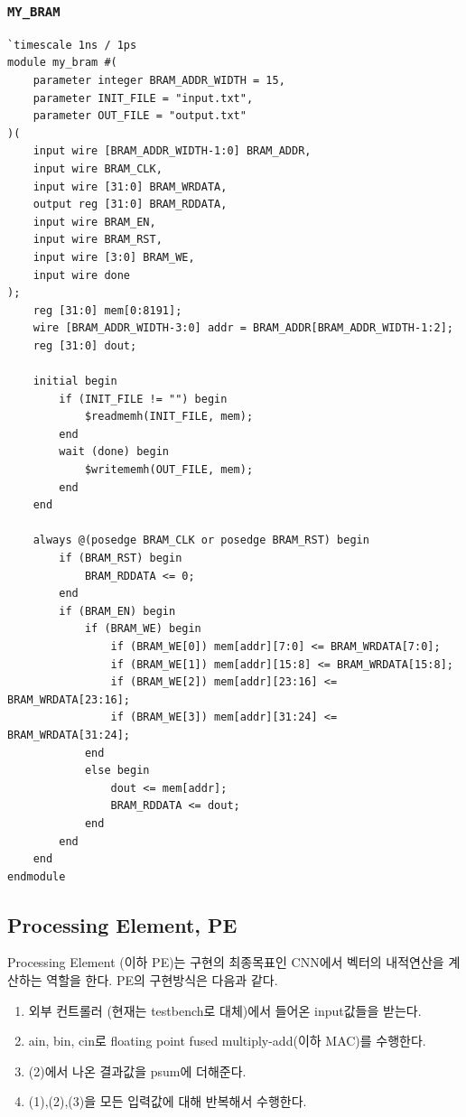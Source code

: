 \documentclass{article}
\begin{document}
\subsubsection*{\texttt{MY\_BRAM}}
\begin{lstlisting}[style={verilog-style}]
`timescale 1ns / 1ps
module my_bram #(
    parameter integer BRAM_ADDR_WIDTH = 15,
    parameter INIT_FILE = "input.txt",
    parameter OUT_FILE = "output.txt"
)(
    input wire [BRAM_ADDR_WIDTH-1:0] BRAM_ADDR,
    input wire BRAM_CLK,
    input wire [31:0] BRAM_WRDATA,
    output reg [31:0] BRAM_RDDATA,
    input wire BRAM_EN,
    input wire BRAM_RST,
    input wire [3:0] BRAM_WE,
    input wire done
);
    reg [31:0] mem[0:8191];
    wire [BRAM_ADDR_WIDTH-3:0] addr = BRAM_ADDR[BRAM_ADDR_WIDTH-1:2];
    reg [31:0] dout;
    
    initial begin
        if (INIT_FILE != "") begin
            $readmemh(INIT_FILE, mem);
        end
        wait (done) begin
            $writememh(OUT_FILE, mem);
        end
    end
    
    always @(posedge BRAM_CLK or posedge BRAM_RST) begin
        if (BRAM_RST) begin 
            BRAM_RDDATA <= 0;
        end
        if (BRAM_EN) begin
            if (BRAM_WE) begin
                if (BRAM_WE[0]) mem[addr][7:0] <= BRAM_WRDATA[7:0];
                if (BRAM_WE[1]) mem[addr][15:8] <= BRAM_WRDATA[15:8];
                if (BRAM_WE[2]) mem[addr][23:16] <= BRAM_WRDATA[23:16];
                if (BRAM_WE[3]) mem[addr][31:24] <= BRAM_WRDATA[31:24]; 
            end
            else begin
                dout <= mem[addr];
                BRAM_RDDATA <= dout;
            end
        end
    end
endmodule
\end{lstlisting}

\subsection{Processing Element, PE}

Processing Element (이하 PE)는 구현의 최종목표인 CNN에서 벡터의 내적연산을 계산하는 역할을 한다. PE의 구현방식은 다음과 같다.
\begin{enumerate}
    \item 외부 컨트롤러 (현재는 testbench로 대체)에서 들어온 input값들을 받는다.
    \item ain, bin, cin로 floating point fused multiply-add(이하 MAC)를 수행한다.
    \item (2)에서 나온 결과값을 psum에 더해준다.
    \item (1),(2),(3)을 모든 입력값에 대해 반복해서 수행한다.
\end{enumerate}
\end{document}
